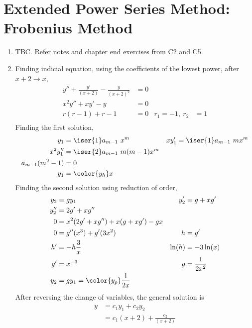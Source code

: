 \section{Extended Power Series Method: Frobenius Method}
\begin{enumerate}
    \item TBC. Refer notes and chapter end exercises from C2 and C5.

    \item Finding indicial equation, using the coefficients of the lowest power, after
          $ x+2 \to x $,
          \begin{align}
              y'' + \frac{y'}{(x+2)} - \frac{y}{(x+2)^2} & = 0   \\
              x^2y'' + xy' - y                           & = 0   \\
              r(r - 1) + r - 1                           & = 0 &
              r_1 = -1,\ r_2                             & = 1   \\
          \end{align}
          Finding the first solution,
          \begin{align}
              y_1               & = \iser{1} a_{m-1}\ x^{m}        &
              xy_1'             & = \iser{1} a_{m-1}\ m x^{m}        \\
              x^2 y_1''         & = \iser{2} a_{m-1}\ m(m-1) x^{m}   \\
              a_{m-1} (m^2 - 1) & = 0                                \\
              y_1               & = \color{y_h} x
          \end{align}
          Finding the second solution using reduction of order,
          \begin{align}
              y_2    & = gy_1                               &
              y_2'   & = g + xg'                              \\
              y_2''  & = 2g' + xg''                           \\
              0      & = x^2 (2g' + xg'') + x(g + xg') - gx   \\
              0      & = g''(x^3) + g'(3x^2)                &
              h      & = g'                                   \\
              h'     & = -h \frac{3}{x}                     &
              \ln(h) & = -3\ln(x)                             \\
              g'     & = x^{-3}                             &
              g      & = \frac{1}{2x^2}                       \\
              y_2    & = gy_1 = \color{y_p} \frac{1}{2x}
          \end{align}
          After reversing the change of variables, the general solution is
          \begin{align}
              y & = c_1 y_1 + c_2 y_2             \\
                & = c_1 (x+2) + \frac{c_2}{(x+2)}
          \end{align}


\end{enumerate}
